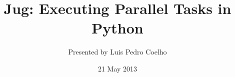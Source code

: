 \documentclass{beamer}
\title[Jug]{Jug: Executing Parallel Tasks in Python}
\author{Presented by Luis Pedro Coelho}
\institute{EMLB}
\date{21 May 2013}
\begin{document}
\frame{\titlepage}
\end{document}
